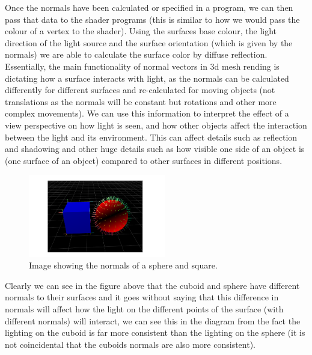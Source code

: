 \documentclass{mm2}
\begin{document}
\begin{enumerate}
Once the normals have been calculated or specified in a program, we can then pass that data to the shader programs (this is similar to how we would pass the colour of a vertex to the shader). Using the surfaces base colour, the light direction of the light  source and the surface orientation (which is given by the normals) we are able to calculate the surface color by diffuse reflection. Essentially, the main functionality of normal vectors in 3d mesh rending is dictating how a surface interacts with light, as the normals can be calculated differently for different surfaces and re-calculated for moving objects (not translations as the normals will be constant but rotations and other more complex movements). We can use this information to interpret the effect of a view perspective on how light is seen, and how other objects affect the interaction between the light and its environment. This can affect details such as reflection and shadowing and other huge details such as how visible one side of an object is (one surface of an object) compared to other surfaces in different positions.

\begin{figure}[ht]
	\centering
	\includegraphics[width=6cm]{NORMALS.PNG}
	\caption{Image showing the normals of a sphere and square.}
\end{figure}

Clearly we can see in the figure above that the cuboid and sphere have different normals to their surfaces and it goes without saying that this difference in normals will affect how the light on the different points of the surface (with different normals) will interact, we can see this in the diagram from the fact the lighting on the cuboid is far more consistent than the lighting on the sphere (it is not coincidental that the cuboids normals are also more consistent).\\


\end{enumerate}
\end{document}
